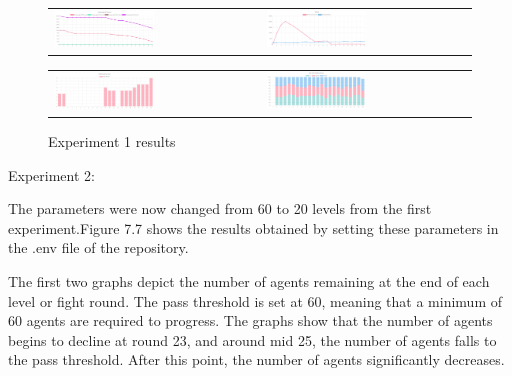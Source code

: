\begin{figure}[htbp]
\begin{tabular}{ll}
    \centering
    \includegraphics[width=0.5\textwidth]{007_team_4_agent_design/figures/EX1_3.jpg}
    &
    \includegraphics[width=0.5\textwidth]{007_team_4_agent_design/figures/EX1_4.jpg}
\end{tabular}
     
\end{figure}


\begin{figure}[htbp]
\begin{tabular}{ll}
    \centering
    \includegraphics[width=0.5\textwidth]{007_team_4_agent_design/figures/EX1_5.jpg}
    &
    \includegraphics[width=0.5\textwidth]{007_team_4_agent_design/figures/EX1_6.jpg}
\end{tabular}
    \caption{Experiment 1 results}
\end{figure}

\newpage

Experiment 2:
\par The parameters were now changed from 60 to 20 levels from the first experiment.Figure 7.7 shows the results obtained by setting these parameters in the .env file of the repository. 

The first two graphs depict the number of agents remaining at the end of each level or fight round. The pass threshold is set at 60, meaning that a minimum of 60 agents are required to progress. The graphs show that the number of agents begins to decline at round 23, and around mid 25, the number of agents falls to the pass threshold. After this point, the number of agents significantly decreases.

